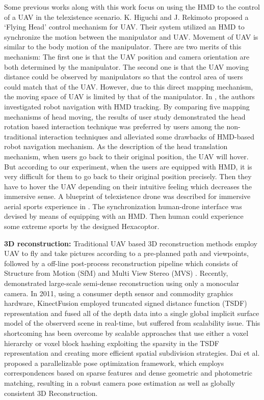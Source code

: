 \documentclass[journal]{IEEEtran}
\begin{document}
Some previous works along with this work focus on using the HMD to the control 
of a UAV in the telexistence scenario. K. Higuchi 
and J. Rekimoto \cite{Higuchi:2013:FHH:2468356.2468721} proposed 
a ‘Flying Head’ 
control mechanism for UAV. Their system utilized an HMD to synchronize the motion between 
the manipulator and UAV. Movement of UAV is similar to the body motion of the manipulator. 
There are two merits of this mechanism: The first one is that the UAV position and camera 
orientation are both determined by the manipulator. The second one is that the UAV moving 
distance could be observed by manipulators so that the control area of users could match 
that of the UAV. However, due to this direct mapping mechanism, the moving space of UAV is 
limited by that of the manipulator. 
In \cite{Pittman:2014:EHT:2557500.2557527}, the authors investigated robot navigation with 
HMD tracking. By comparing five mapping mechanisms of head moving, the results of user study 
demonstrated the head rotation based interaction technique was preferred by users among the 
non-traditional interaction techniques and alleviated some drawbacks of HMD-based robot 
navigation mechanism. As the description of the head translation mechanism, when users go 
back to their original position, the UAV will hover. But according to our experiment, when 
the users are equipped with HMD, it is very difficult for them to go back to their original 
position precisely. Then they have to hover the UAV depending on their intuitive feeling 
which decreases the immersive sense. A blueprint of telexistence drone was described for 
immersive aerial sports experience in \cite{Hayakawa:2015:TDD:2735711.2735816}. The synchronization human-drone interface was 
devised by means of equipping with an HMD. Then human could experience some extreme sports 
by the designed Hexacoptor.

\textbf{3D reconstruction:}
Traditional UAV based 3D reconstruction methods employ UAV to fly and take pictures 
according to a pre-planned path and viewpoints, followed by a off-line post-process 
reconstruction pipeline which consists of Structure from Motion (SfM) 
\cite{Harltey2003Multiple} and Multi View Stereo (MVS) \cite{CGV-052}. Recently, 
\cite{10.1007/978-3-319-10605-2_54} demonstrated large-scale semi-dense 
reconstruction using only a monocular camera. In 2011, using a consumer depth 
sensor and commodity graphics hardware, KinectFusion \cite{6162880} employed 
truncated signed distance function (TSDF) representation and fused 
all of the depth data into a single global implicit surface model of the observerd 
scene in real-time, but suffered from scalability issue. This shortcoming has been 
overcome by scalable approaches that use either a voxel hierarchy 
\cite{Chen:2013:SRV:2461912.2461940} or voxel block hashing 
\cite{niener2013real-time} exploiting the sparsity in the TSDF representation and
creating more efficient spatial subdivision strategies. Dai et al. 
\cite{dai2017bundlefusion} proposed a parallelizable pose optimization framework, 
which employs correspondences based on sparse features and dense geometric and 
photometric matching, resulting in a robust camera pose estimation as well as 
globally consistent 3D Reconstruction.
\end{document}
